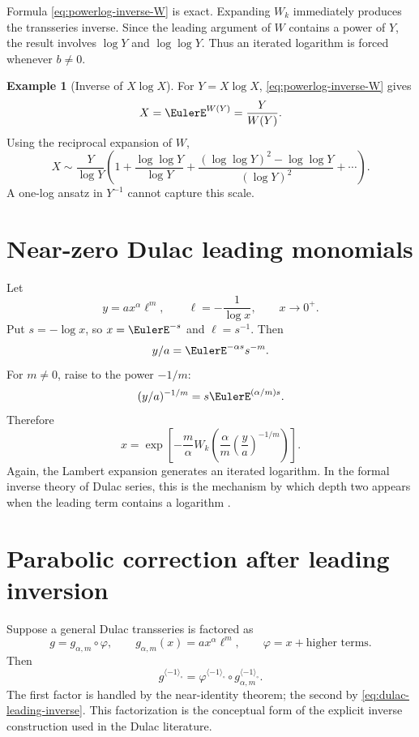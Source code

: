 \documentclass[11pt,openany]{book}
\theoremstyle{definition}
\newtheorem{example}{Example}[chapter]
\theoremstyle{plain}
\theoremstyle{remark}
\newcommand{\invcomp}{^{\langle -1\rangle_{\circ}}}
\begin{document}
Formula \cref{eq:powerlog-inverse-W} is exact. Expanding \(W_k\) immediately produces the transseries inverse. Since the leading argument of \(W\) contains a power of \(Y\), the result involves \(\log Y\) and \(\log\log Y\). Thus an iterated logarithm is forced whenever \(b\ne0\).

\begin{example}[Inverse of \(X\log X\)]
For \(Y=X\log X\), \cref{eq:powerlog-inverse-W} gives
\begin{equation}\label{eq:inverse-XlogX-exact}
 X=\EulerE^{W(Y)}=\frac{Y}{W(Y)}.
\end{equation}
Using the reciprocal expansion of \(W\),
\[
 X\sim\frac{Y}{\log Y}
 \left(1+\frac{\log\log Y}{\log Y}
 +\frac{(\log\log Y)^2-\log\log Y}{(\log Y)^2}
 +\cdots\right).
\]
A one-log ansatz in \(Y^{-1}\) cannot capture this scale.
\end{example}

\section{Near-zero Dulac leading monomials}
Let
\begin{equation}\label{eq:dulac-leading}
 y=a x^\alpha\ell^m,
 \qquad \ell=-\frac1{\log x},
 \qquad x\to0^+.
\end{equation}
Put \(s=-\log x\), so \(x=\EulerE^{-s}\) and \(\ell=s^{-1}\). Then
\[
 y/a=\EulerE^{-\alpha s}s^{-m}.
\]
For \(m\ne0\), raise to the power \(-1/m\):
\[
 (y/a)^{-1/m}=s \EulerE^{(\alpha/m)s}.
\]
Therefore
\begin{equation}\label{eq:dulac-leading-inverse}
 x=
 \exp\left[-\frac m\alpha
 W_k\left(
 \frac\alpha m\left(\frac ya\right)^{-1/m}
 \right)\right].
\end{equation}
Again, the Lambert expansion generates an iterated logarithm. In the formal inverse theory of Dulac series, this is the mechanism by which depth two appears when the leading term contains a logarithm \cite{mardesic-length}.

\section{Parabolic correction after leading inversion}
Suppose a general Dulac transseries is factored as
\begin{equation}\label{eq:dulac-factor}
 g=g_{\alpha,m}\circ\varphi,
 \qquad
 g_{\alpha,m}(x)=a x^\alpha\ell^m,
 \qquad
 \varphi=x+\text{higher terms}.
\end{equation}
Then
\begin{equation}\label{eq:dulac-factor-inverse}
 g\invcomp=\varphi\invcomp\circ g_{\alpha,m}\invcomp.
\end{equation}
The first factor is handled by the near-identity theorem; the second by \cref{eq:dulac-leading-inverse}. This factorization is the conceptual form of the explicit inverse construction used in the Dulac literature.
\end{document}
